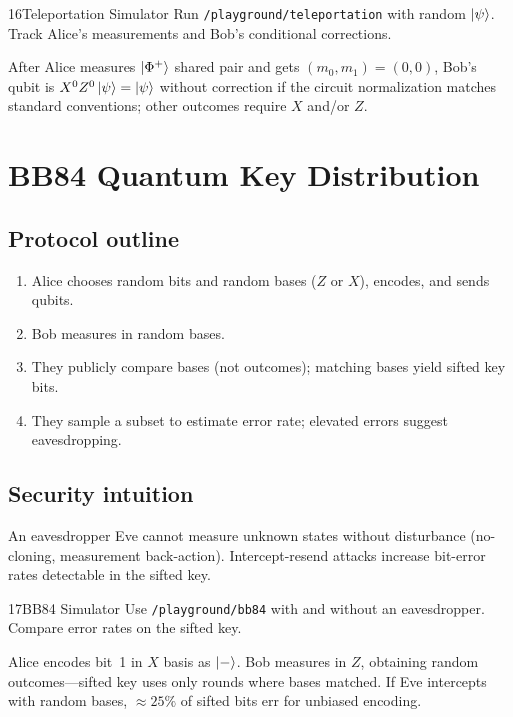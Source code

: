 \begin{labbox}{16}{Teleportation Simulator}
Run \texttt{/playground/teleportation} with random $\ket{\psi}$. Track Alice's measurements and Bob's conditional corrections.
\end{labbox}

\begin{example}
After Alice measures $\ket{\Phi^+}$ shared pair and gets $(m_0,m_1)=(0,0)$, Bob's qubit is $X^0Z^0\ket{\psi}=\ket{\psi}$ without correction if the circuit normalization matches standard conventions; other outcomes require $X$ and/or $Z$.
\end{example}

\section{BB84 Quantum Key Distribution}
\label{sec:bb84}

\subsection{Protocol outline}

\begin{enumerate}[noitemsep]
\item Alice chooses random bits and random bases ($Z$ or $X$), encodes, and sends qubits.
\item Bob measures in random bases.
\item They publicly compare bases (not outcomes); matching bases yield sifted key bits.
\item They sample a subset to estimate error rate; elevated errors suggest eavesdropping.
\end{enumerate}

\subsection{Security intuition}

An eavesdropper Eve cannot measure unknown states without disturbance (no-cloning, measurement back-action). Intercept-resend attacks increase bit-error rates detectable in the sifted key.

\begin{labbox}{17}{BB84 Simulator}
Use \texttt{/playground/bb84} with and without an eavesdropper. Compare error rates on the sifted key.
\end{labbox}

\begin{example}
Alice encodes bit~1 in $X$ basis as $\ket{-}$. Bob measures in $Z$, obtaining random outcomes---sifted key uses only rounds where bases matched. If Eve intercepts with random bases, $\approx 25\%$ of sifted bits err for unbiased encoding.
\end{example}

